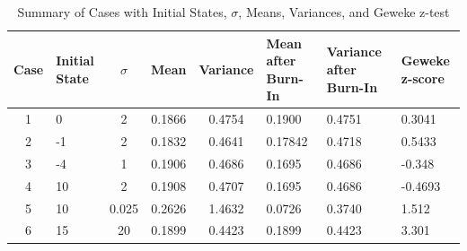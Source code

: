 \begin{example}
    \begin{table}[ht]
        \centering
        \begin{tabular}{|c|p{2cm}|c|c|c|p{2cm}|p{2cm}|p{2cm}|}
            \hline
            Case & Initial State & $\sigma$ & Mean & Variance & Mean after Burn-In & Variance after Burn-In & Geweke z-score \\ \hline
            1 & 0 & 2 & 0.1866 & 0.4754 & 0.1900 & 0.4751 & 0.3041 \\ \hline
            2 & -1 & 2 & 0.1832 & 0.4641 & 0.17842 & 0.4718 & 0.5433 \\ \hline
            3 & -4 & 1 & 0.1906 & 0.4686 & 0.1695 & 0.4686 & -0.348 \\ \hline
            4 & 10 & 2 & 0.1908 & 0.4707 & 0.1695 & 0.4686 & -0.4693 \\ \hline
            5 & 10 & 0.025 & 0.2626 & 1.4632 & 0.0726 & 0.3740 & 1.512 \\ \hline
            6 & 15 & 20 & 0.1899 & 0.4423 & 0.1899 & 0.4423 & 3.301 \\ \hline
        \end{tabular}
        \caption{Summary of Cases with Initial States, $\sigma$, Means, Variances, and Geweke z-test}
    \end{table}

\end{example}


